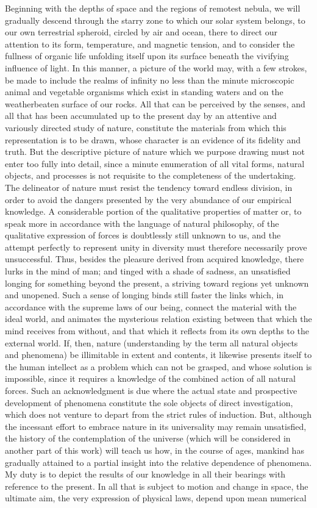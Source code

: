 Beginning with the depths of space and the regions of remotest nebula, we will gradually descend through the starry zone to which our solar system belongs, to our own terrestrial spheroid, circled by air and ocean, there to direct our attention to its form, temperature, and magnetic tension, and to consider the fullness of organic life unfolding itself upon its surface beneath the vivifying influence of light. In this manner, a picture of the world may, with a few strokes, be made to include the realms of infinity no less than the minute microscopic animal and vegetable organisms which exist in standing waters and on the weatherbeaten surface of our rocks. All that can be perceived by the senses, and all that has been accumulated up to the present day by an attentive and variously directed study of nature, constitute the materials from which this representation is to be drawn, whose character is an evidence of its fidelity and truth. But the descriptive picture of nature which we purpose drawing must not enter too fully into detail, since a minute enumeration of all vital forms, natural objects, and processes is not requisite to the completeness of the undertaking. The delineator of nature must resist the tendency toward endless division, in order to avoid the dangers presented by the very abundance of our empirical knowledge. A considerable portion of the qualitative properties of matter or, to speak more in accordance with the language of natural philosophy, of the qualitative expression of forces is doubtlessly still unknown to us, and the attempt perfectly to represent unity in diversity must therefore necessarily prove unsuccessful. Thus, besides the pleasure derived from acquired knowledge, there lurks in the mind of man; and tinged with a shade of sadness, an unsatisfied longing for something beyond the present, a striving toward regions yet unknown and unopened. Such a sense of longing binds still faster the links which, in accordance with the supreme laws of our being, connect the material with the ideal world, and animates the mysterious relation existing between that which the mind receives from without, and that which it reflects from its own depths to the external world. If, then, nature (understanding by the term all natural objects and phenomena) be illimitable in extent and contents, it likewise presents itself to the human intellect as a problem which can not be grasped, and whose solution is impossible, since it requires a knowledge of the combined action of all natural forces. Such an acknowledgment is due where the actual state and prospective development of phenomena constitute the sole objects of direct investigation, which does not venture to depart from the strict rules of induction. But, although the incessant effort to embrace nature in its universality may remain unsatisfied, the history of the contemplation of the universe (which will be considered in another part of this work) will teach us how, in the course of ages, mankind has gradually attained to a partial insight into the relative dependence of phenomena. My duty is to depict the results of our knowledge in all their bearings with reference to the present. In all that is subject to motion and change in space, the ultimate aim, the very expression of physical laws, depend upon mean numerical 